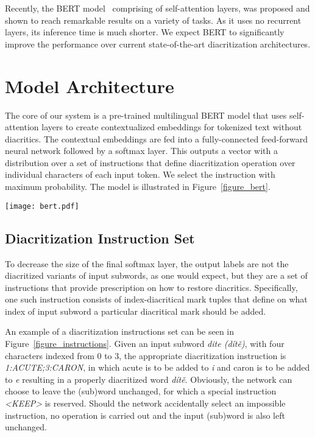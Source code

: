 \documentclass{pbmlarxiv}
\begin{document}
Recently, the BERT model~\cite{devlin2018bert} comprising of self-attention layers, was proposed and shown to reach remarkable results on a variety of tasks. As it uses no recurrent layers, its inference time is much shorter. 
We expect BERT to significantly improve the performance over current state-of-the-art diacritization architectures.


\section{Model Architecture}

The core of our system is a pre-trained multilingual BERT model that uses self-attention layers to create contextualized embeddings for tokenized text without diacritics. The contextual embeddings are fed into a fully-connected feed-forward neural network followed by a softmax layer. This outputs a vector with a distribution over a set of instructions that define diacritization operation over individual characters of each input token. We select the instruction with maximum probability. The model is illustrated in Figure~\ref{figure_bert}.

\begin{figure*}
    \centering
    \texttt{[image: bert.pdf]}    
    \caption{Model architecture. Text without diacritics, tokenized into subwords, is fed to BERT and for each of its outputs, fully-connected network followed by softmax is applied to obtain the most probable instruction for diacritization. \#\#-prefixes of some subwords are added by the BERT tokenizer.}
    \label{figure_bert}
\end{figure*}

\subsection{Diacritization Instruction Set}

To decrease the size of the final softmax layer, the output labels are not the diacritized variants of input subwords, as one would expect, but they are a set of instructions that provide prescription on how to restore diacritics. Specifically, one such instruction consists of index-diacritical mark tuples that define on what index of input subword a particular diacritical mark should be added.

An example of a diacritization instructions set can be seen in Figure~\ref{figure_instructions}. Given an input subword \textit{dite (dítě)}, with four characters indexed from $0$ to $3$, the appropriate diacritization instruction is \textit{1:ACUTE;3:CARON}, in which acute is to be added to \textit{i} and caron is to be added to \textit{e} resulting in a properly diacritized word \textit{dítě}. Obviously, the network can choose to leave the (sub)word unchanged, for which a special instruction \textit{<KEEP>} is reserved. Should the network accidentally select an impossible instruction, no operation is carried out and the input (sub)word is also left unchanged.
\end{document}
